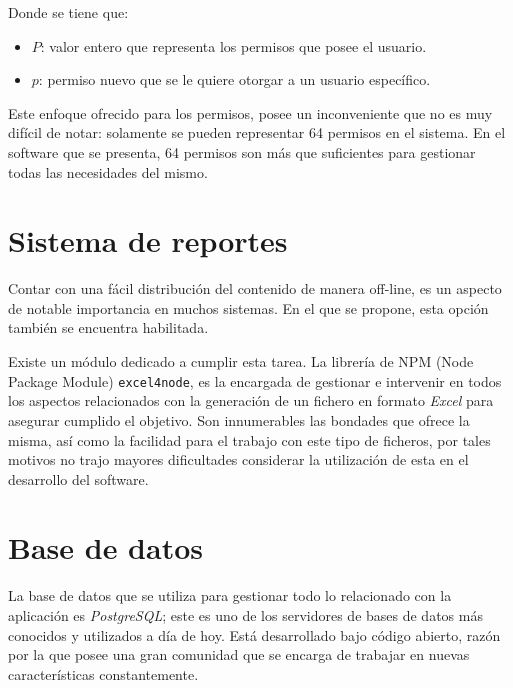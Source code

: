 \noindent Donde se tiene que: \\
\begin{itemize}
	\item $P$: valor entero que representa los permisos que posee el usuario.
	\item $p$: permiso nuevo que se le quiere otorgar a un usuario específico.
\end{itemize}

Este enfoque ofrecido para los permisos, posee un inconveniente que no es muy difícil de notar: solamente se pueden representar 64 permisos en el sistema. En el software que se presenta, 64 permisos son más que suficientes para  gestionar todas las necesidades del mismo.

\section{Sistema de reportes}

Contar con una fácil distribución del contenido de manera off-line, es un aspecto de notable importancia en muchos sistemas. En el que se propone, esta opción también se encuentra habilitada. 

Existe un módulo dedicado a cumplir esta tarea. La librería de NPM (Node Package Module) \texttt{excel4node}, es la encargada de gestionar e intervenir en todos los aspectos relacionados con la generación de un fichero en formato \textit{Excel} para asegurar cumplido el objetivo. Son innumerables las bondades que ofrece la misma, así como la facilidad para el trabajo con este tipo de ficheros, por tales motivos no trajo mayores dificultades considerar la utilización de esta en el desarrollo del software.\cite{excel4node_npm}

\section{Base de datos}

La base de datos que se utiliza para gestionar todo lo relacionado con la aplicación es \textit{PostgreSQL}; este es uno de los servidores de bases de datos más conocidos y utilizados a día de hoy. Está desarrollado bajo código abierto, razón por la que posee una gran comunidad que se encarga de trabajar en nuevas características constantemente. 

